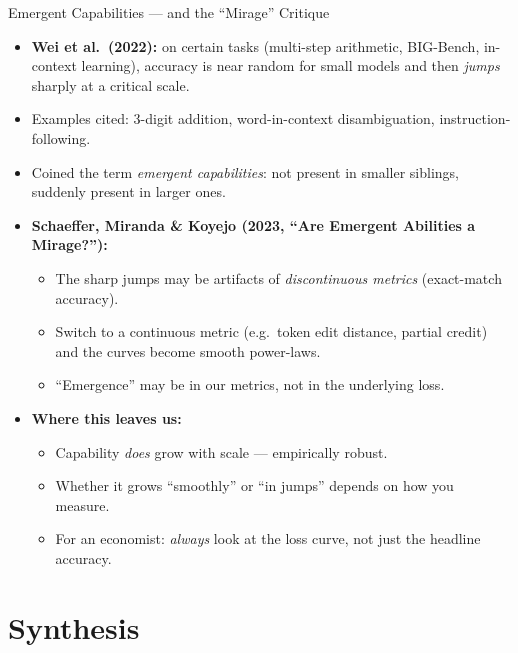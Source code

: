\begin{frame}{Emergent Capabilities --- and the ``Mirage'' Critique}
\begin{itemize}
\item \textbf{Wei et al.\ (2022):} on certain tasks (multi-step arithmetic, BIG-Bench, in-context learning), accuracy is near random for small models and then \emph{jumps} sharply at a critical scale.
\item Examples cited: 3-digit addition, word-in-context disambiguation, instruction-following.
\item Coined the term \emph{emergent capabilities}: not present in smaller siblings, suddenly present in larger ones.

\medskip
\item \textbf{Schaeffer, Miranda \& Koyejo (2023, ``Are Emergent Abilities a Mirage?''):}
\begin{itemize}
\item The sharp jumps may be artifacts of \emph{discontinuous metrics} (exact-match accuracy).
\item Switch to a continuous metric (e.g.\ token edit distance, partial credit) and the curves become smooth power-laws.
\item ``Emergence'' may be in our metrics, not in the underlying loss.
\end{itemize}

\medskip
\item \textbf{Where this leaves us:}
\begin{itemize}
\item Capability \emph{does} grow with scale --- empirically robust.
\item Whether it grows ``smoothly'' or ``in jumps'' depends on how you measure.
\item For an economist: \emph{always} look at the loss curve, not just the headline accuracy.
\end{itemize}
\end{itemize}
\end{frame}

\section{Synthesis}


